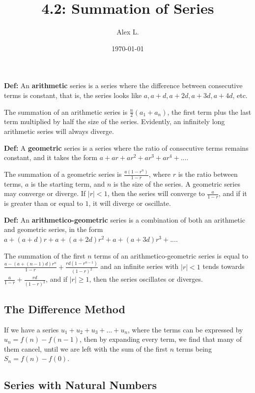 \documentclass{article}
\title{4.2: Summation of Series}
\author{Alex L.}
\date{\today}
\begin{document}
\maketitle

\textbf{Def:} An \textbf{arithmetic} series is a series where the difference between consecutive terms is constant, that is, the series looks like $a, a+d, a+2d, a+3d, a+4d$, etc. 

The summation of an arithmetic series is $\frac{n}{2}(a_1 + a_n)$, the first term plus the last term multiplied by half the size of the series. Evidently, an infinitely long arithmetic series will always diverge. 

\textbf{Def:} A \textbf{geometric} series is a series where the ratio of consecutive terms remains constant, and it takes the form $a + ar + ar^2 + ar^3 + ar^4 + ...$.

The summation of a geometric series is $\frac{a(1-r^n)}{1-r}$, where $r$ is the ratio between terms, $a$ is the starting term, and $n$ is the size of the series. A geometric series may converge or diverge. If $\vert r \vert < 1$, then the series will converge to $\frac{a}{1-r}$, and if it is greater than or equal to $1$, it will diverge or oscillate.

\textbf{Def:} An \textbf{arithmetico-geometric} series is a combination of both an arithmetic and geometric series, in the form $a+(a+d)r + a+(a+2d)r^2 + a+(a+3d)r^3 + ...$. 

The summation of the first $n$ terms of an arithmetico-geometric series is equal to $\frac{a-(a+(n-1)d)r^n}{1-r} + \frac{rd(1-r^{n-1})}{(1-r)^2}$ and an infinite series with $\vert r \vert < 1$ tends towards $\frac{a}{1-r} + \frac{rd}{(1-r)^2}$, and if $\vert r \vert \geq 1$, then the series oscillates or diverges.

\subsection{The Difference Method}

If we have a series $u_1 + u_2 + u_3 + ... + u_n$, where the terms can be expressed by $u_n = f(n) - f(n-1)$, then by expanding every term, we find that many of them cancel, until we are left with the sum of the first $n$ terms being $S_n = f(n) - f(0)$.

\subsection{Series with Natural Numbers}
\end{document}
